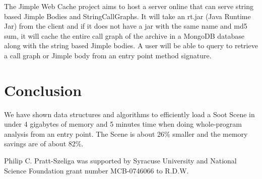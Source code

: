 \documentclass[preprint]{sigplanconf}
\begin{document}
The Jimple Web Cache project aims to host a server online that can serve string based Jimple Bodies and StringCallGraphs. It will take an rt.jar (Java Runtime Jar) from the client and if it does not have a jar with the same name and md5 sum, it will cache the entire call graph of the archive in a MongoDB database along with the string based Jimple bodies. A user will be able to query to retrieve a call graph or Jimple body from an entry point method signature.

\section{Conclusion}
\label{sec:conclusion}
We have shown data structures and algorithms to efficiently load a Soot Scene in under 4 gigabytes of memory and 5 minutes time when doing whole-program analysis from an entry point. The Scene is about 26\% smaller and the memory savings are of about 82\%.

\acks
Philip C. Pratt-Szeliga was supported by Syracuse University and National Science Foundation grant number MCB-0746066 to R.D.W.









\end{document}
